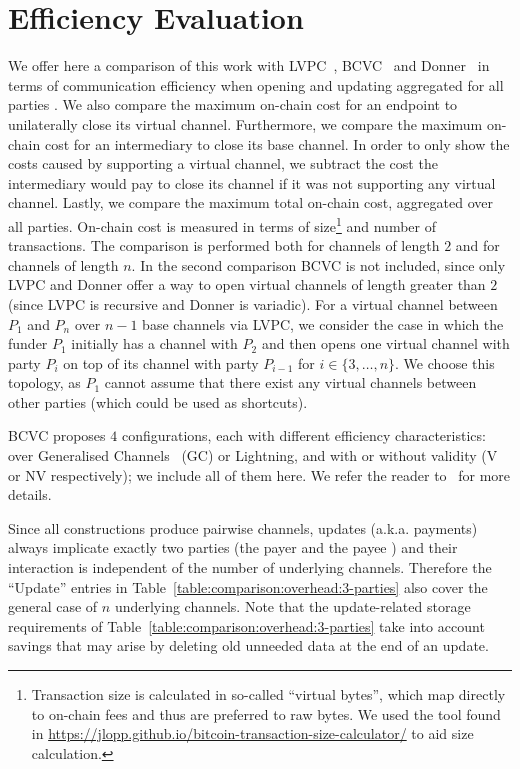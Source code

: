\section{Efficiency Evaluation}
  \label{section:comparison}
  We offer here a comparison of this work with
  LVPC~\cite{10.1007/978-3-030-65411-5_18}, BCVC~\cite{cryptoeprint:2020:554}
  and Donner~\cite{donner} in terms of communication efficiency when opening and
  updating aggregated for all parties . We also compare
  the maximum on-chain cost for an endpoint to unilaterally close its virtual
  channel. Furthermore, we compare the maximum on-chain cost for an intermediary
  to close its base channel. In order to only show the costs caused by
  supporting a virtual channel, we subtract the cost the intermediary would pay
  to close its channel if it was not supporting any virtual channel. Lastly, we
  compare the maximum total on-chain cost, aggregated over all parties. On-chain
  cost is measured in terms of size\footnote{Transaction size is calculated in
  so-called ``virtual bytes'', which map directly to on-chain fees and thus are
  preferred to raw bytes. We used the tool found in
  \url{https://jlopp.github.io/bitcoin-transaction-size-calculator/} to aid size
  calculation.} and number of transactions. The comparison is performed both for
  channels of length $2$ and for channels of length $n$. In the second
  comparison BCVC is not included, since only LVPC and Donner offer a way to
  open virtual channels of length greater than $2$ (since LVPC is recursive and
  Donner is variadic). For a virtual channel between $P_1$ and $P_n$ over $n-1$
  base channels via LVPC, we consider the case in which the funder $P_1$
  initially has a channel with $P_2$ and then opens one virtual channel with
  party $P_i$ on top of its channel with party $P_{i-1}$ for $i \in \{3, \dots,
  n\}$. We choose this topology, as $P_1$ cannot assume that there exist any
  virtual channels between other parties (which could be used as shortcuts).

  BCVC proposes $4$ configurations, each with different efficiency
  characteristics: over Generalised Channels~\cite{cryptoeprint:2020:476} (GC)
  or Lightning, and with or without validity (V or NV respectively); we include
  all of them here. We refer the reader to~\cite{cryptoeprint:2020:554} for more
  details.

  Since all constructions produce pairwise channels, updates (a.k.a. payments)
  always implicate exactly two parties (the payer and the payee ) and
  their interaction is independent of the number of underlying channels.
  Therefore the ``Update'' entries in Table~\ref{table:comparison:overhead:3-parties} also
  cover the general case of $n$ underlying channels. Note that the
  update-related storage requirements of
  Table~\ref{table:comparison:overhead:3-parties} take into account savings that
  may arise by deleting old unneeded data at the end of an update. 

